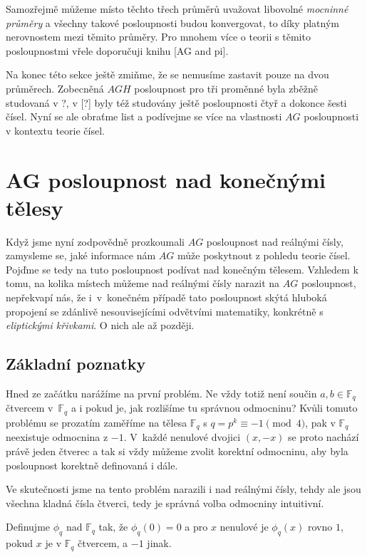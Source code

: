 \documentclass[12pt]{report}
\begin{document}
Samozřejmě můžeme místo těchto třech průměrů uvažovat libovolné \textit{mocninné průměry} a všechny takové posloupnosti budou konvergovat, to díky platným nerovnostem mezi těmito průměry. Pro mnohem více o teorii s těmito posloupnostmi vřele doporučuji knihu [AG and pi].

Na konec této sekce ještě zmiňme, že se nemusíme zastavit pouze na dvou průměrech. Zobecněná $AGH$ posloupnost pro tři proměnné byla zběžně studovaná v ?, v [?] byly též studovány ještě posloupnosti čtyř a dokonce šesti čísel. Nyní se ale obraťme list a podívejme se více na vlastnosti $AG$ posloupnosti v kontextu teorie čísel. 



\chapter{AG posloupnost nad konečnými tělesy}

Když jsme nyní zodpovědně prozkoumali $AG$ posloupnost nad reálnými čísly, zamysleme se, jaké informace nám $AG$ může poskytnout z pohledu teorie čísel. Pojďme se tedy na tuto posloupnost podívat nad konečným tělesem. Vzhledem k tomu, na kolika místech můžeme nad reálnými čísly narazit na $AG$ posloupnost, nepřekvapí nás, že i~v~konečném případě tato posloupnost skýtá hluboká propojení se zdánlivě nesouvisejícími odvětvími matematiky, konkrétně s \textit{eliptickými křivkami}. O nich ale až později.


\section{Základní poznatky}

Hned ze začátku narážíme na první problém. Ne vždy totiž není součin $a,b \in \mathbb{F}_q$ čtvercem v~$\mathbb{F}_q$ a i pokud je, jak rozlišíme tu správnou odmocninu? Kvůli tomuto problému se prozatím zaměříme na tělesa $\mathbb{F}_q$ s $q = p^k \equiv -1 \pmod{4}$, pak v $\mathbb{F}_q$ neexistuje odmocnina z $-1$. V~každé nenulové dvojici $(x,-x)$ se proto nachází právě jeden čtverec a tak si vždy můžeme zvolit korektní odmocninu, aby byla posloupnost korektně definovaná i dále.  

\begin{poznamka}
Ve skutečnosti jsme na tento problém narazili i nad reálnými čísly, tehdy ale jsou všechna kladná čísla čtverci, tedy je správná volba odmocniny intuitivní.
\end{poznamka}

\begin{definice}
Definujme  $\phi_q$ nad $\mathbb{F}_q$ tak, že $\phi_q(0) = 0$ a pro $x$ nenulové je $\phi_q(x)$ rovno $1$, pokud $x$ je v $\mathbb{F}_q$ čtvercem,  a $-1$ jinak.
\end{definice}
\end{document}
